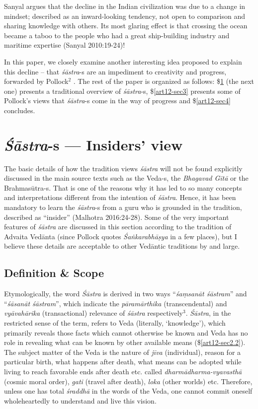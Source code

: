 Sanyal argues that the decline in the Indian civilization was due to a change in mindset; described as an inward-looking tendency, not open to comparison and sharing knowledge with others. Its most glaring effect is that crossing the ocean became a taboo to the people who had a great ship-building industry and maritime expertise (Sanyal 2010:19-24)!

	In this paper, we closely examine another interesting idea proposed to explain this decline -- that {\sl śāstra}-s are an impediment to creativity and progress, forwarded by Pollock$^{2}$ . The rest of the paper is organized as follows: \$\ref{art12-sec2} (the next one) presents a traditional overview of {\sl śāstra}-s, \$\ref{art12-sec3} presents some of Pollock's views that {\sl śāstra}-s come in the way of progress and \$\ref{art12-sec4} concludes.

\section{{{\sl\bfseries Śāstra}\relax}-s --- Insiders' view}\label{art12-sec2}

The basic details of how the tradition views {\sl śāstra} will not be found explicitly discussed in the main source texts such as the Veda-s, the {\sl Bhagavad Gītā} or the Brahmasūtra-s. That is one of the reasons why it has led to so many concepts and interpretations different from the intention of {\sl śāstra}. Hence, it has been mandatory to learn the {\sl śāstra}-s from a guru who is grounded in the tradition, described as ``insider'' (Malhotra 2016:24-28). Some of the very important features of {\sl śāstra} are discussed in this section according to the tradition of Advaita Vedānta (since Pollock quotes {\sl Śaṅkarabhāṣya} in a few places), but I believe these details are acceptable to other Vedāntic traditions by and large.

\subsection{Definition \& Scope}\label{art12-sec2.1}

Etymologically, the word {\sl Śāstra} is derived in two ways ``{\sl śaṃsanāt śāstram}'' and ``{\sl śāsanāt śāstram}'', which indicate the {\sl pāramārthika} (transcendental) and {\sl vyāvahārika} (transactional) relevance of {\sl śāstra} respectively$^{3}$. {\sl Śāstra}, in the restricted sense of the term, refers to Veda (literally, `knowledge'), which primarily reveals those facts which cannot otherwise be known and Veda has no role in revealing what can be known by other available means (\$\ref{art12-sec2.2}). The subject matter of the Veda is the nature of {\sl jīva} (individual), reason for a particular birth, what happens after death, what means can be adopted while living to reach favorable ends after death etc. called {\sl dharmādharma-vyavasthā} (cosmic moral order), {\sl gati} (travel after death), {\sl loka} (other worlds) etc. Therefore, unless one has total {\sl śraddhā} in the words of the Veda, one cannot commit oneself wholeheartedly to understand and live this vision. 

